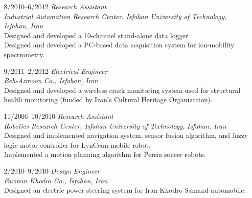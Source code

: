 \documentclass[10pt]{article}
\newlength{\Vspace}
\newlength{\Vspace}
\begin{document}
\begin{CV}
\item[8/2010--6/2012] \textit{Research Assistant} \\
    \textit{Industrial Automation Research Center, Isfahan University of Technology, Isfahan, Iran}\vspace{\Vspace} \\
    Designed and developed a 10-channel stand-alone data logger. \\
    Designed and developed a PC-based data acquisition system for ion-mobility spectrometry.

\item[9/2011--2/2012] \textit{Electrical Engineer} \\
    \textit{Beh-Azmoon Co., Isfahan, Iran}\vspace{\Vspace} \\
    Designed and developed a wireless crack monitoring system used for structural health monitoring (funded by Iran's Cultural Heritage Organization).

\item[11/2006--10/2010] \textit{Research Assistant} \\
    \textit{Robotics Research Center, Isfahan University of Technology, Isfahan, Iran}\vspace{\Vspace} \\
    Designed and implemented navigation system, sensor fusion algorithm, and fuzzy logic motor controller for LynCean mobile robot. \\
    Implemented a motion planning algorithm for Persia soccer robots.

\item[2/2010--9/2010] \textit{Design Engineer} \\
    \textit{Farman Khodro Co., Isfahan, Iran}\vspace{\Vspace} \\
    Designed an electric power steering system for Iran-Khodro Samand automobile.



\end{CV}
\end{document}
